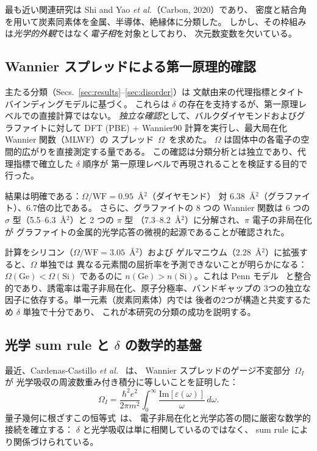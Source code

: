 \documentclass[twocolumn,showpacs,preprintnumbers,amsmath,amssymb,prb]{revtex4-2}
\begin{document}
最も近い関連研究は Shi and Yao \textit{et al.}（Carbon, 2020）であり、
密度と結合角を用いて炭素同素体を金属、半導体、絶縁体に分類した。
しかし、その枠組みは\emph{光学的外観}ではなく\emph{電子相}を対象としており、
次元数変数を欠いている。

\subsection{Wannier スプレッドによる第一原理的確認}
\label{sec:wannier_confirmation}

主たる分類（Secs.~\ref{sec:results}--\ref{sec:disorder}）は
文献由来の代理指標とタイトバインディングモデルに基づく。
これらは $\delta$ の存在を支持するが、第一原理レベルでの直接計算ではない。
\emph{独立な確認}として、バルクダイヤモンドおよびグラファイトに対して
DFT (PBE) + Wannier90 計算を実行し、最大局在化 Wannier 関数（MLWF）の
スプレッド~$\Omega$~\cite{Marzari1997}を求めた。
$\Omega$ は固体中の各電子の空間的広がりを直接測定する量である。
この確認は分類分析とは独立であり、代理指標で確立した $\delta$ 順序が
第一原理レベルで再現されることを検証する目的で行った。

結果は明確である：$\Omega/\mathrm{WF} = 0.95$~\AA$^2$（ダイヤモンド）
対 $6.38$~\AA$^2$（グラファイト）、6.7倍の比である。
さらに、グラファイトの 8 つの Wannier 関数は 6 つの
$\sigma$ 型（5.5--6.3~\AA$^2$）と 2 つの $\pi$ 型
（7.3--8.2~\AA$^2$）に分解され、$\pi$ 電子の非局在化が
グラファイトの金属的光学応答の微視的起源であることが確認された。

計算をシリコン（$\Omega/\mathrm{WF} = 3.05$~\AA$^2$）および
ゲルマニウム（$2.28$~\AA$^2$）に拡張すると、$\Omega$ 単独では
異なる元素間の屈折率を予測できないことが明らかになる：
$\Omega(\mathrm{Ge}) < \Omega(\mathrm{Si})$ であるのに
$n(\mathrm{Ge}) > n(\mathrm{Si})$。これは Penn モデル~\cite{Penn1962}
と整合的であり、誘電率は電子非局在化、原子分極率、バンドギャップの
3つの独立な因子に依存する。単一元素（炭素同素体）内では
後者の2つが構造と共変するため $\delta$ 単独で十分であり、
これが本研究の分類の成功を説明する。

\subsection{光学 sum rule と $\delta$ の数学的基盤}
\label{sec:sum_rule}

最近、Cardenas-Castillo \textit{et al.}~\cite{CardenasCastillo2024} は、
Wannier スプレッドのゲージ不変部分~$\Omega_I$ が
光学吸収の周波数重み付き積分に等しいことを証明した：
\begin{equation}
  \Omega_I = \frac{\hbar^2 e^2}{2\pi m^2}
  \int_0^\infty \frac{\mathrm{Im}[\varepsilon(\omega)]}{\omega}\,d\omega.
  \label{eq:sum_rule}
\end{equation}
量子幾何に根ざすこの恒等式~\cite{RhimKim2025}は、
電子非局在化と光学応答の間に厳密な数学的接続を確立する：
$\delta$ と光学吸収は単に相関しているのではなく、
sum rule により関係づけられている。
\end{document}
